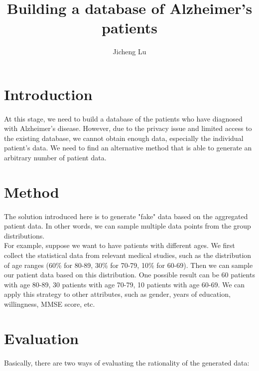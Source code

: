 \documentclass{article}
\title{Building a database of Alzheimer's patients}
\author{Jicheng Lu}
\date{}
\begin{document}
\maketitle

\section{Introduction}
\paragraph{}
At this stage, we need to build a database of the patients who have diagnosed with Alzheimer's disease. However, due to the privacy issue and limited access to the existing database, we cannot obtain enough data, especially the individual patient's data. We need to find an alternative method that is able to generate an arbitrary number of patient data.

\section{Method}
\paragraph{}
The solution introduced here is to generate "fake" data based on the aggregated patient data. In other words, we can sample multiple data points from the group distributions. \\

For example, suppose we want to have patients with different ages. We first collect the statistical data from relevant medical studies, such as the distribution of age ranges (60\% for 80-89, 30\% for 70-79, 10\% for 60-69). Then we can sample our patient data based on this distribution. One possible result can be 60 patients with age 80-89, 30 patients with age 70-79, 10 patients with age 60-69. We can apply this strategy to other attributes, such as gender, years of education, willingness, MMSE score, etc.


\section{Evaluation}
\paragraph{}
Basically, there are two ways of evaluating the rationality of the generated data:
\end{document}
